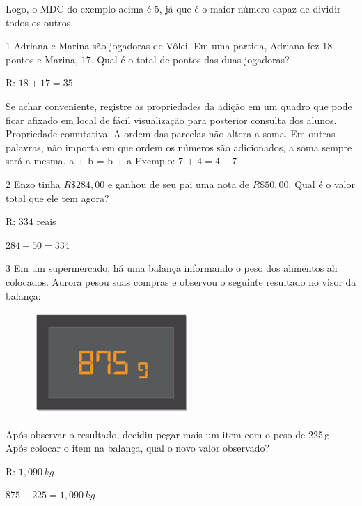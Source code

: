 
  Logo, o MDC do exemplo acima é $5$, já que é o maior número capaz de
dividir todos os outros.


\num{1} Adriana e Marina são jogadoras de Vôlei. Em uma partida, Adriana fez
18 pontos e Marina, $17$. Qual é o total de pontos das duas jogadoras?




R: $18 + 17 = 35$

Se achar conveniente, registre as propriedades da adição em um quadro
que pode ficar afixado em local de fácil visualização para posterior
consulta dos alunos. Propriedade comutativa: A ordem das parcelas não
altera a soma. Em outras palavras, não importa em que ordem os números
são adicionados, a soma sempre será a mesma. a + b = b + a Exemplo: $7$ +
$4 = 4 + 7$

\num{2}  Enzo tinha $R\$284,00$ e ganhou de seu pai uma nota de $R\$50,00$. Qual é
o valor total que ele tem agora?

R: $334$ reais

$284 + 50 = 334$

\num{3}  Em um supermercado, há uma balança informando o peso dos alimentos
ali colocados. Aurora pesou suas compras e observou o seguinte resultado
no visor da balança:

\begin{figure}
\centering\includegraphics[width=2.33333in,height=1.53125in]{./imgSAEB_6_MAT/media/image23.png}
\end{figure}

Após observar o resultado, decidiu pegar mais um item com o peso de
225\,g. Após colocar o item na balança, qual o novo valor observado?

R: $1,090\,kg$

$875 + 225 = 1,090\,kg$

